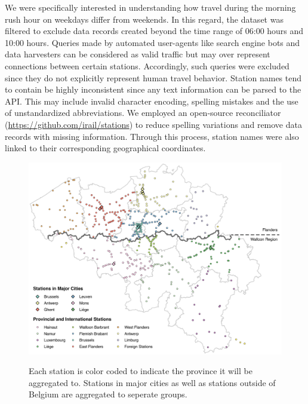 \documentclass{sig-alternate}
\begin{document}
We were specifically interested in understanding how travel during the morning rush hour on weekdays differ from weekends. In this regard, the dataset was filtered to exclude data records created beyond the time range of 06:00 hours and 10:00 hours.
Queries made by automated user-agents like search engine bots and data harvesters can be considered as valid traffic but may over represent connections between certain stations.
Accordingly, such queries were excluded since they do not explicitly represent human travel behavior.
Station names tend to contain be highly inconsistent since any text information can be parsed to the API.
This may include invalid character encoding, spelling mistakes and the use of unstandardized abbreviations.
We employed an open-source reconciliator (\url{https://github.com/irail/stations}) to reduce spelling variations and remove data records with missing information. 
Through this process, station names were also linked to their corresponding geographical coordinates.

\begin{figure}
  \centering
  \includegraphics[width=14cm]{method-c.pdf}\\
  \caption{Each station is color coded to indicate the province it will be aggregated to. Stations in major cities as well as stations outside of Belgium are aggregated to seperate groups.}
  \label{fig:method-c}
\end{figure}
\end{document}
